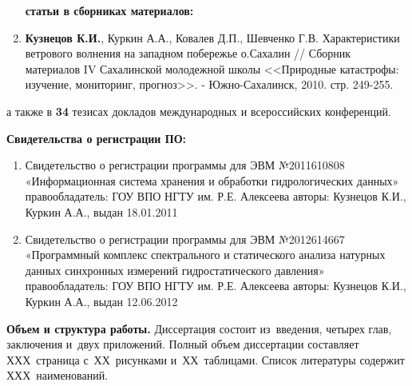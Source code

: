 \begin{enumerate}
\textbf{статьи в сборниках материалов:}

  \item \textbf{Кузнецов К.И.}, Куркин А.А., Ковалев Д.П., Шевченко Г.В. Характеристики ветрового волнения на западном побережье о.Сахалин // Сборник материалов IV Сахалинской молодежной школы <<Природные катастрофы: изучение, мониторинг, прогноз>>. - Южно-Сахалинск, 2010. стр. 249-255.
\end{enumerate}

а также в \textbf{34} тезисах докладов международных и всероссийских конференций.

\textbf{Свидетельства о регистрации ПО:}
\begin{enumerate}
  \item Свидетельство о регистрации программы для ЭВМ №2011610808 «Информационная система хранения и обработки гидрологических данных» правообладатель: ГОУ ВПО НГТУ им. Р.Е. Алексеева авторы: Кузнецов К.И., Куркин А.А., выдан 18.01.2011
  \item Свидетельство о регистрации программы для ЭВМ №2012614667 «Программный комплекс спектрального и статического анализа натурных данных синхронных измерений гидростатического давления»  правообладатель: ГОУ ВПО НГТУ им. Р.Е. Алексеева авторы: Кузнецов К.И., Куркин А.А., выдан \textcolor[rgb]{1.00,0.00,0.00}{12.06.2012}
\end{enumerate}

\textbf{Объем и структура работы.} Диссертация состоит из~введения, четырех глав, заключения и~двух приложений. Полный объем диссертации составляет ХХХ~страница с~ХХ~рисунками и~ХХ~таблицами. Список литературы содержит ХХХ~наименований.

\clearpage
